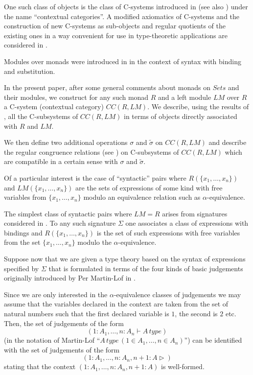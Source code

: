 \documentclass[11pt]{article}
\newcommand{\wt}{\widetilde}
\begin{document}
One such class of objects is the class of C-systems introduced in \cite{Cartmell0} (see also \cite{Cartmell1}) under the name ``contextual categories''. A modified axiomatics of C-systems and the construction of new C-systems as sub-objects and regular quotients of the existing ones in a way convenient for use in type-theoretic applications are considered in \cite{Csubsystems}.

Modules over monads were introduced in \cite{HM2007} in the context of syntax with binding and substitution. 

In the present paper, after some general comments about monads on $Sets$ and their modules, we construct for any such monad $R$ and a left module $LM$ over $R$ a C-system (contextual category) $CC(R,LM)$.   We describe, using the results of \cite{Csubsystems}, all the C-subsystems of $CC(R,LM)$ in terms of objects directly associated with $R$ and $LM$. 

We then define two additional operations $\sigma$ and $\wt{\sigma}$ on $CC(R,LM)$ and describe the regular congruence relations (see \cite{Csubsystems}) on C-subsystems of $CC(R,LM)$ which are compatible in a certain sense with $\sigma$ and $\wt{\sigma}$.

Of a particular interest is the case of ``syntactic'' pairs where $R(\{x_1,\dots,x_n\})$ and $LM(\{x_1,\dots,x_n\})$ are the sets of expressions of some kind with free variables from $\{x_1,\dots,x_n\}$ modulo an equivalence relation such as $\alpha$-equivalence. 

The simplest class of syntactic pairs where $LM=R$ arises from signatures considered in \cite[p.228]{HM2007}. To any such signature $\Sigma$ one associates a class of expressions with bindings and $R(\{x_1,\dots,x_n\})$ is the set of such expressions with free variables from the set $\{x_1,\dots,x_n\}$ modulo the $\alpha$-equivalence.  

Suppose now that we are given a type theory based on the syntax of expressions specified by $\Sigma$ that is formulated in terms of the four kinds of basic judgements originally introduced by Per Martin-Lof in \cite[p.161]{ML78}.  

Since we are only interested in the $\alpha$-equivalence classes of judgements we may assume that the variables declared in the context are taken from the set of natural numbers such that the first declared variable is $1$, the second is $2$ etc.  Then, the set of judgements of the form 
%
$$(1:A_1,\dots,n:A_n\vdash A\, type)$$
%
(in the notation of Martin-Lof ``$A\,type\,(1\in A_1,\dots,n\in A_n)$'') can be identified with the set of judgements of the form 
%
$$(1:A_1,\dots,n:A_n, n+1:A\rhd)$$
%
stating that the context $(1:A_1,\dots,n:A_n, n+1:A)$ is well-formed. 
\end{document}
